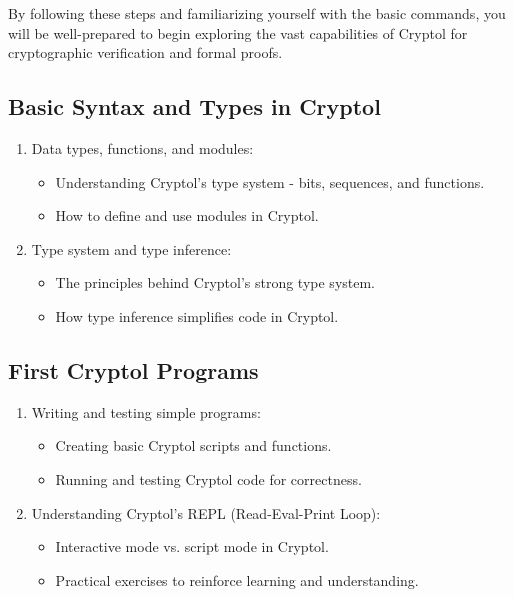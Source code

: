 By following these steps and familiarizing yourself with the basic commands, you will be well-prepared to begin exploring the vast capabilities of Cryptol for cryptographic verification and formal proofs.

\newpage
\subsection{Basic Syntax and Types in Cryptol}
\begin{enumerate}
	\item Data types, functions, and modules:
	\begin{itemize}
		\item Understanding Cryptol's type system - bits, sequences, and functions.
		\item How to define and use modules in Cryptol.
	\end{itemize}
	\item Type system and type inference:
	\begin{itemize}
		\item The principles behind Cryptol's strong type system.
		\item How type inference simplifies code in Cryptol.
	\end{itemize}
\end{enumerate}

\subsection{First Cryptol Programs}
\begin{enumerate}
	\item Writing and testing simple programs:
	\begin{itemize}
		\item Creating basic Cryptol scripts and functions.
		\item Running and testing Cryptol code for correctness.
	\end{itemize}
	\item Understanding Cryptol's REPL (Read-Eval-Print Loop):
	\begin{itemize}
		\item Interactive mode vs. script mode in Cryptol.
		\item Practical exercises to reinforce learning and understanding.
	\end{itemize}
\end{enumerate}

